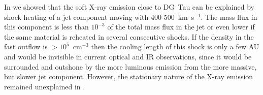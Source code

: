 In \citet{2009A&A...493..579G} we showed that the soft X-ray emission close to DG~Tau can be explained by shock heating of a jet component moving with 400-500~km~s$^{-1}$. The mass flux in this component is less than $10^{-3}$ of the total mass flux in the jet or even lower if the same material is reheated in several consecutive shocks. If the density in the fast outflow is $>10^5$~cm$^{-3}$ then the cooling length of this shock is only a few AU and would be invisible in current optical and IR observations, since it would be surrounded and outshone by the more luminous emission from the more massive, but slower jet component. However, the stationary nature of the X-ray emission remained unexplained in \citet{2009A&A...493..579G}.